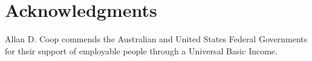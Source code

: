 \documentclass[10pt,letterpaper]{article}
\begin{document}





\section*{Acknowledgments}

Allan D. Coop commends the Australian and United States Federal Governments for their support of employable people through a Universal Basic Income.
\end{document}

